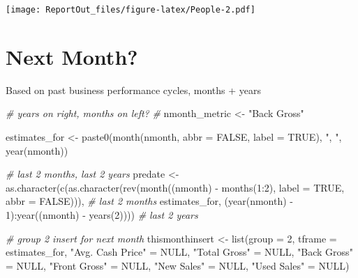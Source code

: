 \documentclass[
]{article}
\newenvironment{Shaded}{\begin{snugshade}}{\end{snugshade}}
\newcommand{\AttributeTok}[1]{\textcolor[rgb]{0.77,0.63,0.00}{#1}}
\newcommand{\CommentTok}[1]{\textcolor[rgb]{0.56,0.35,0.01}{\textit{#1}}}
\newcommand{\ConstantTok}[1]{\textcolor[rgb]{0.00,0.00,0.00}{#1}}
\newcommand{\DecValTok}[1]{\textcolor[rgb]{0.00,0.00,0.81}{#1}}
\newcommand{\FunctionTok}[1]{\textcolor[rgb]{0.00,0.00,0.00}{#1}}
\newcommand{\NormalTok}[1]{#1}
\newcommand{\OtherTok}[1]{\textcolor[rgb]{0.56,0.35,0.01}{#1}}
\newcommand{\SpecialCharTok}[1]{\textcolor[rgb]{0.00,0.00,0.00}{#1}}
\newcommand{\StringTok}[1]{\textcolor[rgb]{0.31,0.60,0.02}{#1}}
\begin{document}
\texttt{[image: ReportOut\_files/figure-latex/People-2.pdf]}

\hypertarget{next-month}{%
\section{Next Month?}\label{next-month}}

Based on past business performance cycles, months + years

\begin{Shaded}
\begin{Highlighting}[]
\CommentTok{\# years on right, months on left?}
\CommentTok{\#}
\NormalTok{nmonth\_metric }\OtherTok{\textless{}{-}} \StringTok{"Back Gross"}

\NormalTok{estimates\_for }\OtherTok{\textless{}{-}} \FunctionTok{paste0}\NormalTok{(}\FunctionTok{month}\NormalTok{(nmonth, }\AttributeTok{abbr =} \ConstantTok{FALSE}\NormalTok{, }\AttributeTok{label =} \ConstantTok{TRUE}\NormalTok{), }\StringTok{", "}\NormalTok{, }\FunctionTok{year}\NormalTok{(nmonth))}

\CommentTok{\# last 2 months, last 2 years}
\NormalTok{predate }\OtherTok{\textless{}{-}} \FunctionTok{as.character}\NormalTok{(}\FunctionTok{c}\NormalTok{(}\FunctionTok{as.character}\NormalTok{(}\FunctionTok{rev}\NormalTok{(}\FunctionTok{month}\NormalTok{((nmonth) }\SpecialCharTok{{-}} \FunctionTok{months}\NormalTok{(}\DecValTok{1}\SpecialCharTok{:}\DecValTok{2}\NormalTok{), }\AttributeTok{label =} \ConstantTok{TRUE}\NormalTok{, }\AttributeTok{abbr =} \ConstantTok{FALSE}\NormalTok{))), }\CommentTok{\# last 2 months}
\NormalTok{                          estimates\_for,}
\NormalTok{                          (}\FunctionTok{year}\NormalTok{(nmonth) }\SpecialCharTok{{-}} \DecValTok{1}\NormalTok{)}\SpecialCharTok{:}\FunctionTok{year}\NormalTok{((nmonth) }\SpecialCharTok{{-}} \FunctionTok{years}\NormalTok{(}\DecValTok{2}\NormalTok{)))) }\CommentTok{\# last 2 years}

\CommentTok{\# group 2 insert for next month}
\NormalTok{thismonthinsert }\OtherTok{\textless{}{-}} \FunctionTok{list}\NormalTok{(}\AttributeTok{group =} \DecValTok{2}\NormalTok{, }
                        \AttributeTok{tframe =}\NormalTok{ estimates\_for, }
                        \StringTok{"Avg. Cash Price"} \OtherTok{=} \ConstantTok{NULL}\NormalTok{,}
                        \StringTok{"Total Gross"} \OtherTok{=} \ConstantTok{NULL}\NormalTok{, }
                        \StringTok{"Back Gross"} \OtherTok{=} \ConstantTok{NULL}\NormalTok{,}
                        \StringTok{"Front Gross"} \OtherTok{=} \ConstantTok{NULL}\NormalTok{, }
                        \StringTok{"New Sales"} \OtherTok{=} \ConstantTok{NULL}\NormalTok{,}
                        \StringTok{"Used Sales"} \OtherTok{=} \ConstantTok{NULL}\NormalTok{)}


\end{Highlighting}
\end{Shaded}
\end{document}
